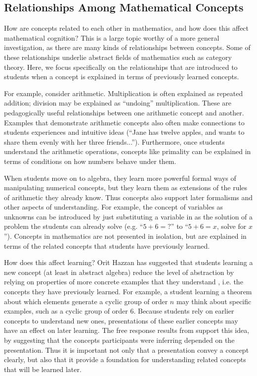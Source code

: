 \documentclass[man,10pt]{apa6}
\begin{document}
\subsection{Relationships Among Mathematical Concepts}
How are concepts related to each other in mathematics, and how does this affect mathematical cognition? This is a large topic worthy of a more general investigation, as there are many kinds of relationships between concepts. Some of these relationships underlie abstract fields of mathematics such as category theory. Here, we focus specifically on the relationships that are introduced to students when a concept is explained in terms of previously learned concepts. \par
For example, consider arithmetic. Multiplication is often explained as repeated addition; division may be explained as ``undoing'' multiplication. These are pedagogically useful relationships between one arithmetic concept and another. Examples that demonstrate arithmetic concepts also often make connections to students experiences and intuitive ideas (``Jane has twelve apples, and wants to share them evenly with her three friends...''). Furthermore, once students understand the arithmetic operations, concepts like primality can be explained in terms of conditions on how numbers behave under them. \par
When students move on to algebra, they learn more powerful formal ways of manipulating numerical concepts, but they learn them as extensions of the rules of arithmetic they already know. Thus concepts also support later formalisms and other aspects of understanding. For example, the concept of variables as unknowns can be introduced by just substituting a variable in as the solution of a problem the students can already solve (e.g. ``$5+6=?$'' to ``$5+6=x$, solve for $x$''). Concepts in mathematics are not presented in isolation, but are explained in terms of the related concepts that students have previously learned. \par 
How does this affect learning? Orit Hazzan has suggested that students learning a new concept (at least in abstract algebra) reduce the level of abstraction by relying on properties of more concrete examples that they understand \cite{Hazzan1999}, i.e. the concepts they have previously learned. For example, a student learning a theorem about which elements generate a cyclic group of order $n$ may think about specific examples, such as a cyclic group of order 6. Because students rely on earlier concepts to understand new ones, presentations of these earlier concepts may have an effect on later learning. The free response results from  support this idea, by suggesting that the concepts participants were inferring depended on the presentation. Thus it is important not only that a presentation convey a concept clearly, but also that it provide a foundation for understanding related concepts that will be learned later. \par
\end{document}
